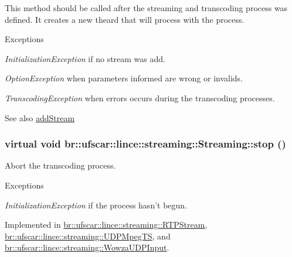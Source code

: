 This method should be called after the streaming and transcoding process was defined. It creates a new theard that will process with the process. 
\begin{DoxyExceptions}{Exceptions}
\item[{\em InitializationException}]if no stream was add. \item[{\em OptionException}]when parameters informed are wrong or invalids. \item[{\em TranscodingException}]when errors occurs during the transcoding processes. \end{DoxyExceptions}
\begin{DoxySeeAlso}{See also}
\hyperlink{classbr_1_1ufscar_1_1lince_1_1streaming_1_1Streaming_ab2739b46d9bd285d4d64100b9d5bb796}{addStream} 
\end{DoxySeeAlso}
\hypertarget{classbr_1_1ufscar_1_1lince_1_1streaming_1_1Streaming_a6fa79a5e9bac37069e91d77be9ef4a54}{
\subsubsection[{stop}]{\setlength{\rightskip}{0pt plus 5cm}virtual void br::ufscar::lince::streaming::Streaming::stop ()}}
\label{classbr_1_1ufscar_1_1lince_1_1streaming_1_1Streaming_a6fa79a5e9bac37069e91d77be9ef4a54}


Abort the transcoding process. 


\begin{DoxyExceptions}{Exceptions}
\item[{\em InitializationException}]if the process hasn't begun. \end{DoxyExceptions}


Implemented in \hyperlink{classbr_1_1ufscar_1_1lince_1_1streaming_1_1RTPStream_a2b4ccacba5f834f28d12c7709d0ec65d}{br::ufscar::lince::streaming::RTPStream}, \hyperlink{classbr_1_1ufscar_1_1lince_1_1streaming_1_1UDPMpegTS_a38862cf512770e1a94df17d013744646}{br::ufscar::lince::streaming::UDPMpegTS}, and \hyperlink{classbr_1_1ufscar_1_1lince_1_1streaming_1_1WowzaUDPInput_a90d2675c73c201ed7bc54d64e419f5a8}{br::ufscar::lince::streaming::WowzaUDPInput}.

